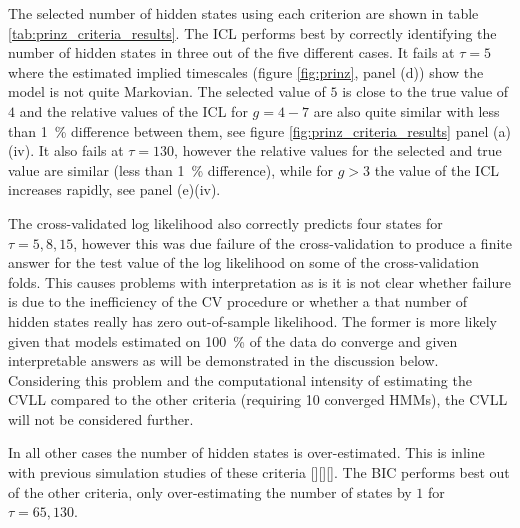 The selected number of hidden states using each criterion are shown in table \ref{tab:prinz_criteria_results}.  The ICL performs best by correctly identifying the number of hidden states in three out of the five different cases. 
It fails at $\tau=5$ where the estimated implied timescales (figure \ref{fig:prinz}, panel (d)) show the model is not quite Markovian. The selected value of $5$ is close to the true value of $4$  and the relative values of the ICL for $g=4 - 7$ are also quite similar with less than \SI{1}{\percent} difference between them, see figure \ref{fig:prinz_criteria_results} panel (a)(iv). It also fails at $\tau=130$, however the relative values for the selected and true value are similar (less than \SI{1}{\percent} difference), while for $g>3$ the value of the ICL increases rapidly, see panel (e)(iv). 

The cross-validated log likelihood also correctly predicts four states for $\tau = 5, 8, 15$, however this was due failure of the cross-validation to produce a finite answer for the test value of the log likelihood on some of the cross-validation folds. This causes problems with interpretation as is it is not clear whether failure is due to the  inefficiency of the CV procedure or whether a that number of hidden states really has zero out-of-sample likelihood. The former is more likely given that models estimated on \SI{100}{\percent} of the data do converge and given interpretable answers as will be demonstrated in the discussion below. Considering this problem and the computational intensity of estimating the CVLL compared to the other criteria (requiring 10 converged HMMs), the CVLL will not be considered further. 

In all other cases the number of hidden states is over-estimated. This is inline with previous simulation studies of these criteria [][][]. The BIC performs best out of the other criteria, only over-estimating the number of states by $1$ for $\tau=65, 130$. 

